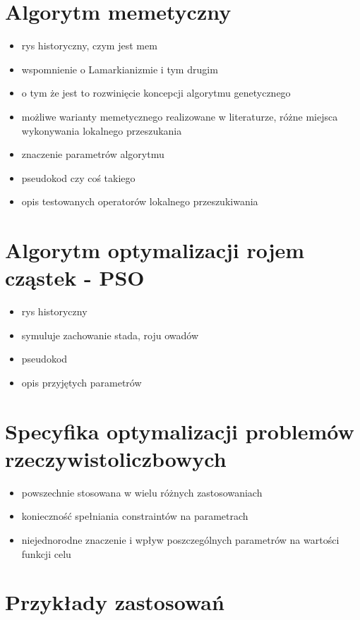 \section{Algorytm memetyczny}
\begin{itemize}
\item rys historyczny, czym jest mem
\item wspomnienie o Lamarkianizmie i tym drugim
\item o tym że jest to rozwinięcie koncepcji algorytmu genetycznego
\item możliwe warianty memetycznego realizowane w literaturze, różne miejsca wykonywania lokalnego przeszukania
\item znaczenie parametrów algorytmu
\item pseudokod czy coś takiego
\item opis testowanych operatorów lokalnego przeszukiwania
\end{itemize}

\section{Algorytm optymalizacji rojem cząstek - PSO}
\begin{itemize}
\item rys historyczny
\item symuluje zachowanie stada, roju owadów
\item pseudokod
\item opis przyjętych parametrów
\end{itemize}

\section{Specyfika optymalizacji problemów rzeczywistoliczbowych}
\begin{itemize}
\item powszechnie stosowana w wielu różnych zastosowaniach
\item konieczność spełniania constraintów na parametrach
\item niejednorodne znaczenie i wpływ poszczególnych parametrów na wartości funkcji celu
\end{itemize}

\section{Przykłady zastosowań}